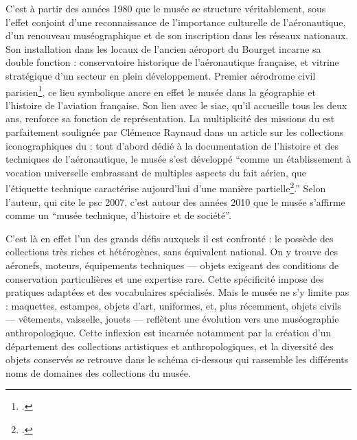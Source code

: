 C’est à partir des années 1980 que le musée se structure véritablement, sous l’effet conjoint d’une reconnaissance de l’importance culturelle de l’aéronautique, d’un renouveau muséographique et de son inscription dans les réseaux nationaux. 
Son installation dans les locaux de l'ancien aéroport du Bourget incarne sa double fonction : conservatoire historique de l'aéronautique française, et vitrine stratégique d'un secteur en plein développement. Premier aérodrome civil parisien\footcite{terrierAeroportParisBourget2019}, ce lieu symbolique ancre en effet le musée dans la géographie et l’histoire de l’aviation française. Son lien avec le \ac{siae}, qu’il accueille tous les deux ans, renforce sa fonction de représentation.
La multiplicité des missions du \mae est parfaitement soulignée par Clémence Raynaud dans un article sur les collections iconographiques du \mae : tout d'abord dédié à la documentation de l'histoire et des techniques de l'aéronautique, le musée s'est développé \enquote{comme un établissement à vocation universelle embrassant de multiples aspects du fait aérien, que l’étiquette technique caractérise aujourd’hui d’une manière partielle\footcite{raynaudMuseeTechniqueDhistoire2018}.} Selon l'auteur, qui cite le \ac{psc} 2007, c'est autour des années 2010 que le musée s'affirme comme un \enquote{musée technique, d’histoire et de société}.

C'est là en effet l'un des grands défis auxquels il est confronté : le \mae possède des collections très riches et hétérogènes, sans équivalent national. On y trouve des aéronefs, moteurs, équipements techniques — objets exigeant des conditions de conservation particulières et une expertise rare. Cette spécificité impose des pratiques adaptées et des vocabulaires spécialisés. Mais le musée ne s’y limite pas : maquettes, estampes, objets d’art, uniformes, et, plus récemment, objets civils — vêtements, vaisselle, jouets — reflètent une évolution vers une muséographie anthropologique. Cette inflexion est incarnée notamment par la création d'un département des collections artistiques et anthropologiques, et la diversité des objets conservés se retrouve dans le schéma ci-dessous qui rassemble les différents noms de domaines des collections du musée.


